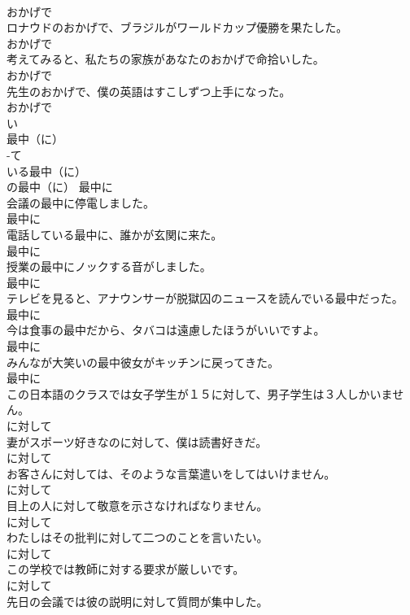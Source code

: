 \documentclass[8pt]{extreport}
\begin{document}
\begin{CJK}{UTF8}{min}
\\	おかげで
\\	ロナウドのおかげで、ブラジルがワールドカップ優勝を果たした。	
\\	おかげで
\\	考えてみると、私たちの家族があなたのおかげで命拾いした。	
\\	おかげで
\\	先生のおかげで、僕の英語はすこしずつ上手になった。	
\\	おかげで
\\	い
\\	最中（に）	
\\	-て
\\	いる最中（に）	
\\	の最中（に）	最中に
\\	会議の最中に停電しました。	
\\	最中に
\\	電話している最中に、誰かが玄関に来た。	
\\	最中に
\\	授業の最中にノックする音がしました。	
\\	最中に
\\	テレビを見ると、アナウンサーが脱獄囚のニュースを読んでいる最中だった。	
\\	最中に
\\	今は食事の最中だから、タバコは遠慮したほうがいいですよ。	
\\	最中に
\\	みんなが大笑いの最中彼女がキッチンに戻ってきた。	
\\	最中に
\\	この日本語のクラスでは女子学生が１５に対して、男子学生は３人しかいません。	
\\	に対して
\\	妻がスポーツ好きなのに対して、僕は読書好きだ。	
\\	に対して
\\	お客さんに対しては、そのような言葉遣いをしてはいけません。	
\\	に対して
\\	目上の人に対して敬意を示さなければなりません。	
\\	に対して
\\	わたしはその批判に対して二つのことを言いたい。	
\\	に対して
\\	この学校では教師に対する要求が厳しいです。	
\\	に対して
\\	先日の会議では彼の説明に対して質問が集中した。	

\end{CJK}
\end{document}
